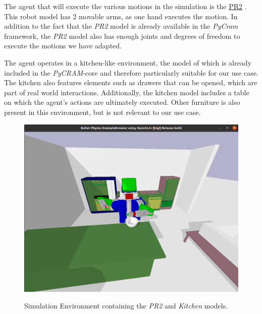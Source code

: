 The agent that will execute the various motions in the simulation is the \hyperref[sec:pr2]{PR2} \cite{pr2}.
This robot model has 2 movable arms, as one hand executes the motion. In addition to the fact that the \textit{PR2} \cite{pr2} model is already available in the \textit{PyCram} \cite{pycram} framework,
the \textit{PR2} \cite{pr2} model also has enough joints and degrees of freedom to execute the motions we have adapted.

The agent operates in a kitchen-like environment, the model of which is already included in the \textit{PyCRAM}-core \cite{pycram} and therefore particularly suitable for our use case. The kitchen also features elements such as drawers that can be opened, which are part of real world interactions. Additionally, the kitchen model includes a table on which the agent's actions are ultimately executed. Other furniture is also present in this environment, but is not relevant to our use case.

\begin{figure}[H]
    \includegraphics[scale=0.35]{Graphics/bulletworldexample.png}
    \label{fig:bulletworldexample}
    \caption{Simulation Environment containing the \textit{PR2} and \textit{Kitchen} models. }
\end{figure}

